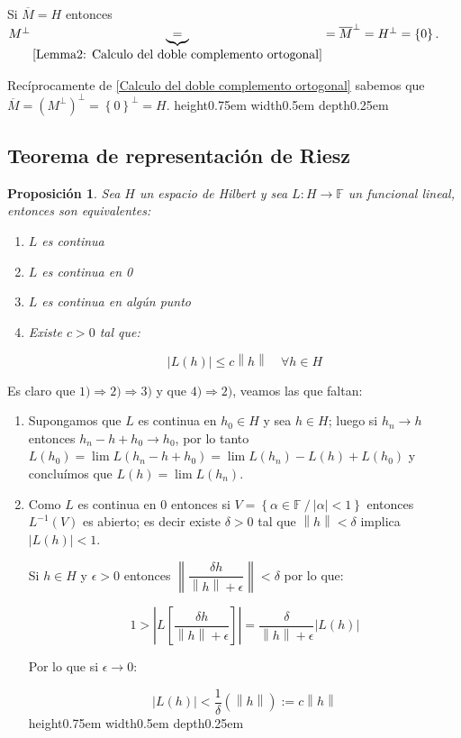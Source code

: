 \documentclass[11pt]{article}
\newcommand{\norm}[1]{\left\lVert#1\right\rVert}
\newcommand{\abs}[1]{\left\lvert#1\right\rvert}
\newcommand{\sett}[1]{\left\lbrace#1\right\rbrace}
\numberwithin{theorem}{subsection}
\newtheorem{proposition}[theorem]{Proposici\'on}
\newenvironment{proof}[1][Demostraci\'on]{\begin{trivlist}
		\item[\hskip \labelsep {\bfseries #1}]}{\end{trivlist}}
\newcommand{\qed}{\nobreak \ifvmode \relax \else
	\ifdim\lastskip<1.5em \hskip-\lastskip
	\hskip1.5em plus0em minus0.5em \fi \nobreak
	\vrule height0.75em width0.5em depth0.25em\fi}
\begin{document}
\begin{proof}
	Si $\overline{M} = H$ entonces $M^{\perp} \underbrace{=}_{\ref{Lemma2: Calculo del doble complemento ortogonal}} = \overline{M}^{\perp} = H^{\perp} = \sett{0}$.
	
	Rec\'iprocamente de \ref{Calculo del doble complemento ortogonal} sabemos que $\overline{M} = \left(M^{\perp}\right)^{\perp} = \sett{0}^{\perp} = H$. \qed
\end{proof}

\subsection{Teorema de representaci\'on de Riesz}

\begin{proposition}
	\label{Continuidad de un funcional}
	Sea $H$ un espacio de Hilbert y sea $L : H \rightarrow \mathbb{F}$ un funcional lineal, entonces son equivalentes:
	
	\begin{enumerate}
		\item $L$ es continua
		\item $L$ es continua en 0
		\item $L$ es continua en alg\'un punto
		\item Existe $c > 0$ tal que:
		
		\begin{equation}
		\label{eq: Funcional acotado}
			\abs{L(h)} \leq c \norm{h} \quad \forall h \in H
		\end{equation}  
	\end{enumerate}
\end{proposition}

\begin{proof}
	Es claro que $1) \Longrightarrow 2) \Longrightarrow 3)$ y que $4) \Longrightarrow 2)$, veamos las que faltan:
	
	\begin{enumerate}
		\item[$3) \Longrightarrow 1)$]Supongamos que $L$ es continua en $h_0 \in H$ y sea $h \in H$; luego si $h_n \rightarrow h$ entonces $h_n - h + h_0 \rightarrow h_0$, por lo tanto $L(h_0) = \lim L(h_n - h + h_0) = \lim L(h_n) - L(h) + L(h_0)$ y conclu\'imos que $L(h) = \lim L(h_n)$.
		
		\item[$ 2) \Longrightarrow 4) $] Como $L$ es continua en $0$ entonces si $V = \sett{\alpha \in \mathbb{F} \ / \ \abs{\alpha} < 1}$ entonces $L^{-1}(V)$ es abierto; es decir existe $\delta > 0$ tal que $\norm{h} < \delta$ implica $\abs{L(h)} < 1$.
		
		Si $h \in H$ y $\epsilon > 0$ entonces $\norm{\dfrac{\delta h}{\norm{h} + \epsilon}} < \delta$ por lo que:
		
		\[
			1 > \abs{L\left[\dfrac{\delta h}{\norm{h} + \epsilon}\right]} = \dfrac{\delta}{\norm{h} + \epsilon} \abs{L(h)}
		\]
		
		Por lo que si $\epsilon \rightarrow 0$:
		
		\[
			\abs{L(h)} < \dfrac{1}{\delta} \left(\norm{h}\right) := c \norm{h}
		\]
		\qed
	\end{enumerate}
\end{proof}
\end{document}
